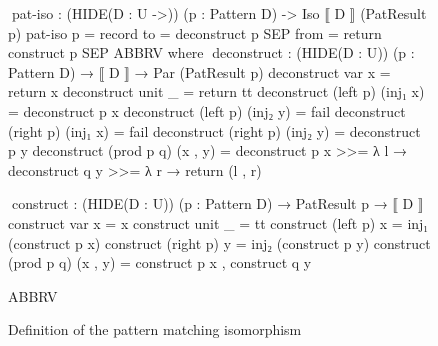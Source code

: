 \documentclass{sigplanconf}
\newcommand{\beforefigure}{\setlength{\mathindent}{0em}}
\begin{document}
\begin{figure}
\beforefigure
\begin{code}
^^^pat-iso : (HIDE({D : U} ->)) (p : Pattern D) -> Iso ⟦ D ⟧ (PatResult p)
pat-iso p = record  {    to    = deconstruct p
                    SEP  from  = return ∘ construct p SEP ABBRV }
  where
    ^^^deconstruct :
      (HIDE({D : U})) (p : Pattern D) → ⟦ D ⟧ → Par (PatResult p)
    deconstruct var         x          = return x
    deconstruct unit        _          = return tt
    deconstruct (left   p)  (inj₁  x)  = deconstruct p x
    deconstruct (left   p)  (inj₂  y)  = fail
    deconstruct (right  p)  (inj₁  x)  = fail
    deconstruct (right  p)  (inj₂  y)  = deconstruct p y
    deconstruct (prod p q)  (x , y)    =  deconstruct p   x  >>= λ l  →
                                          deconstruct q   y  >>= λ r  →
                                          return (l , r)
    
    ^^^construct : (HIDE({D : U})) (p : Pattern D) → PatResult p → ⟦ D ⟧
    construct var         x         = x
    construct unit        _         = tt
    construct (left   p)  x         = inj₁ (construct p x)
    construct (right  p)  y         = inj₂ (construct p y)
    construct (prod p q)  (x , y)   = construct p x , construct q y
    
    ABBRV
\end{code}
\caption{Definition of the pattern matching isomorphism}
\label{fig:pat-iso}
\end{figure}
\end{document}
